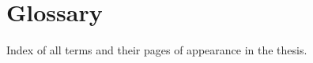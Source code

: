 \glsaddallunused%

\cleardoublepage {}
\pagestyle{glossaryfancy}
\addtocounter{chapter}{+1}
\chapter[Glossary]{\centering Glossary}%
\label{Backmatter:Glossary}\label{\chaptername::\thechapter}
\vspace*{-0.5cm}
\noindent\begin{center}
	Index of all terms and their pages of appearance in the thesis.
\end{center}
\vspace*{-0.5cm}
\printglossary[
	style=mcoltreegroup,%
	title={\vspace*{-1cm}},
]
